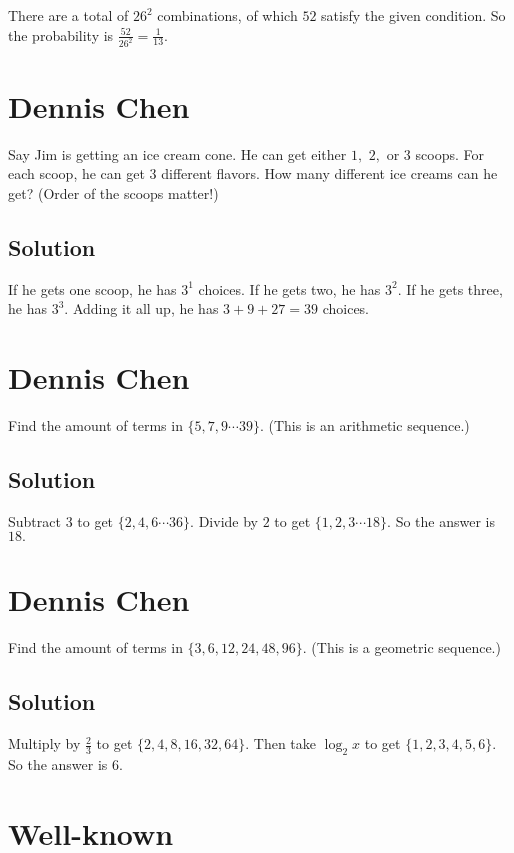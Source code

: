 \documentclass[blue,onecol]{shooting}
\begin{document}
There are a total of $26^2$ combinations, of which $52$ satisfy the given condition. So the probability is $\frac{52}{26^2}=\frac{1}{13}.$

\section{Dennis Chen}

Say Jim is getting an ice cream cone. He can get either $1,$ $2,$ or $3$ scoops. For each scoop, he can get $3$ different flavors. How many different ice creams can he get? (Order of the scoops matter!)

\subsection{Solution}

If he gets one scoop, he has $3^1$ choices. If he gets two, he has $3^2.$ If he gets three, he has $3^3.$ Adding it all up, he has $3+9+27=39$ choices.

\section{Dennis Chen}

Find the amount of terms in $\{5,7,9\cdots 39\}.$ (This is an arithmetic sequence.)

\subsection{Solution}

Subtract $3$ to get $\{2,4,6\cdots 36\}.$ Divide by $2$ to get $\{1,2,3\cdots 18\}.$ So the answer is $18.$

\section{Dennis Chen}

Find the amount of terms in $\{3,6,12,24,48,96\}.$ (This is a geometric sequence.)

\subsection{Solution}

Multiply by $\frac{2}{3}$ to get $\{2,4,8,16,32,64\}.$ Then take $\log_2{x}$ to get $\{1,2,3,4,5,6\}.$ So the answer is $6.$

\section{Well-known}
\end{document}
